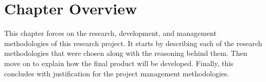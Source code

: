 \section{Chapter Overview}

This chapter forces on the research, development, and management methodologies of this research project. It starts by describing each of the research methodologies that were chosen along with the reasoning behind them. Then move on to explain how the final product will be developed. Finally, this concludes with justification for the project management methodologies.